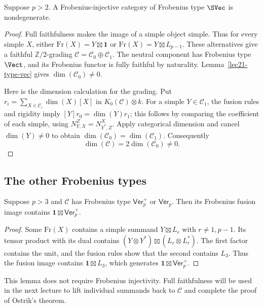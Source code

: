 \begin{lemma}\label{lec21-type-svec}
Suppose $p>2$. A Frobenius-injective category of Frobenius type $\SVec$
is nondegenerate.
\end{lemma}
\begin{proof}
Full faithfulness makes the image of a simple object simple. Thus for
every simple $X$, either
$\mathrm{Fr}(X)=Y\boxtimes\mathbf1$ or
$\mathrm{Fr}(X)=Y\boxtimes L_{p-1}$.
These alternatives give a faithful $\mathbb Z/2$-grading
$\mathcal C=\mathcal C_0\oplus\mathcal C_1$. The neutral component has
Frobenius type $\Vect$, and its Frobenius functor is fully faithful by
naturality. Lemma~\ref{lec21-type-vec} gives
$\dim(\mathcal C_0)\ne0$.

Here is the dimension calculation for the grading. Put
$r_i=\sum_{X\in\mathcal C_i}\dim(X)[X]$ in $K_0(\mathcal C)\otimes k$.
For a simple $Y\in\mathcal C_1$, the fusion rules and rigidity imply
$[Y]r_0=\dim(Y)r_1$; this follows by comparing the coefficient of each
simple, using $N_{Y,X}^{Z}=N_{Y^*,Z}^{X}$.
Apply categorical dimension and cancel $\dim(Y)\ne0$ to obtain
$\dim(\mathcal C_0)=\dim(\mathcal C_1)$. Consequently
\[
 \dim(\mathcal C)=2\dim(\mathcal C_0)\ne0.
\]
\end{proof}

\subsection{The other Frobenius types}
\begin{lemma}\label{lec21-ver-plus-in-image}
Suppose $p>3$ and $\mathcal C$ has Frobenius type $\mathsf{Ver}_p^+$ or
$\mathsf{Ver}_p$. Then its Frobenius fusion image contains
$\mathbf1\boxtimes\mathsf{Ver}_p^+$.
\end{lemma}
\begin{proof}
Some $\mathrm{Fr}(X)$ contains a simple summand $Y\boxtimes L_r$ with
$r\ne1,p-1$. Its tensor product with its dual contains
$(Y\otimes Y^*)\boxtimes(L_r\otimes L_r^*)$.
The first factor contains the unit, and the fusion rules show that the
second contains $L_3$. Thus the fusion image contains
$\mathbf1\boxtimes L_3$, which generates
$\mathbf1\boxtimes\mathsf{Ver}_p^+$.
\end{proof}
This lemma does not require Frobenius injectivity. Full faithfulness will
be used in the next lecture to lift individual summands back to
$\mathcal C$ and complete the proof of Ostrik's theorem.

